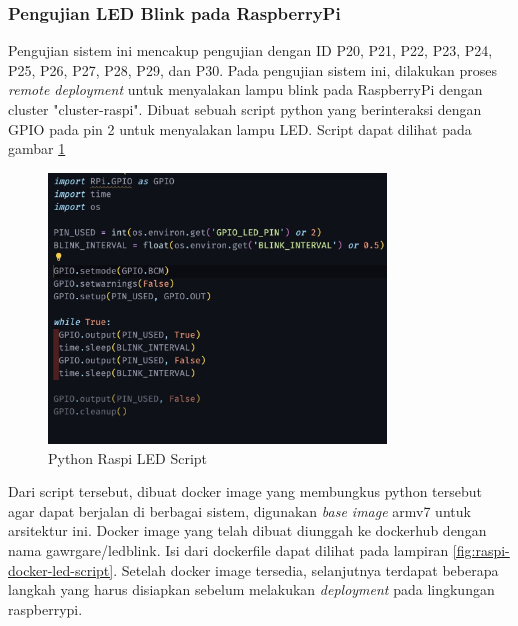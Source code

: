 \subsubsection{Pengujian LED Blink pada RaspberryPi}

Pengujian sistem ini mencakup pengujian dengan ID P20, P21, P22, P23, P24, P25, P26, P27, P28, P29, dan P30. Pada pengujian sistem ini, dilakukan proses \textit{remote deployment} untuk menyalakan lampu blink pada RaspberryPi dengan cluster "cluster-raspi". Dibuat sebuah script python yang berinteraksi dengan GPIO pada pin 2 untuk menyalakan lampu LED. Script dapat dilihat pada gambar \ref{fig:raspi-python-led-script}

\begin{figure}[ht]
  \centering
  \includegraphics[width=0.8\textwidth]{resources/chapter-4/pengujian/pengujian-sistem-raspi-09-led.jpg}
  \caption{Python Raspi LED Script}
  \label{fig:raspi-python-led-script}
\end{figure}

Dari script tersebut, dibuat docker image yang membungkus python tersebut agar dapat berjalan di berbagai sistem, digunakan \textit{base image} armv7 untuk arsitektur ini. Docker image yang telah dibuat diunggah ke dockerhub dengan nama {gawrgare/led\textunderscore blink}. Isi dari dockerfile dapat dilihat pada lampiran \ref{fig:raspi-docker-led-script}. Setelah docker image tersedia, selanjutnya terdapat beberapa langkah yang harus disiapkan sebelum melakukan \textit{deployment} pada lingkungan raspberrypi.

